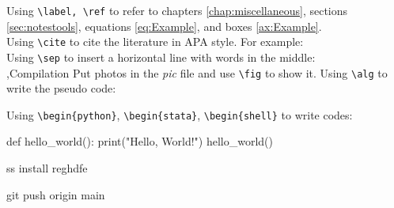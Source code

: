 \documentclass[12pt]{report}
\begin{document}
\no Using \verb=\label, \ref= to refer to chapters \ref{chap:miscellaneous},
sections \ref{sec:notestools}, equations \ref{eq:Example}, and boxes \ref{ax:Example}.\\
\no Using \verb=\cite= to cite the literature in APA style. For example:
\cite{Angrist}\\
\no Using \verb=\sep= to insert a horizontal line with words in the middle:\\
\sep{Compilation}
Put photos in the \textit{pic} file and use \verb|\fig| to show it.
Using \verb=\alg= to write the pseudo code:

\no Using \verb=\begin{python}=, \verb=\begin{stata}=, \verb=\begin{shell}= to write codes:
\begin{python}
    def hello_world():
    print("Hello, World!")
    hello_world()
\end{python}

\begin{stata}
    ss install reghdfe
\end{stata}

\begin{shell}
    git push origin main
\end{shell}

\newpage
\listoffigures

\newpage
\listofalgorithms



\end{document}
